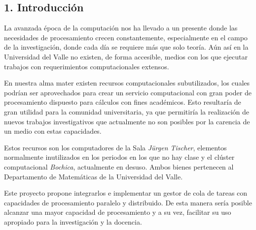 \begin{doublespace}
\begin{tightcenter}
\section{1. Introducción}
\mylinespacing
\end{tightcenter}

La avanzada época de la computación nos ha llevado a un presente donde las necesidades de procesamiento crecen constantemente, especialmente en el campo de la investigación, donde cada día se requiere más que solo teoría. Aún así en la Universidad del Valle no existen, de forma accesible, medios con los que ejecutar trabajos con requerimientos computacionales extensos.

\vspace{3mm} 

En nuestra alma mater existen recursos computacionales subutilizados, los cuales podrían ser aprovechados para crear un servicio computacional con gran poder de procesamiento dispuesto para cálculos con fines académicos. Esto resultaría de gran utilidad para la comunidad universitaria, ya que permitiría la realización de nuevos trabajos investigativos que actualmente no son posibles por la carencia de un medio con estas capacidades.

\vspace{3mm} 

Estos recursos son los computadores de la Sala \textit{Jürgen Tischer}, elementos normalmente inutilizados en los periodos en los que no hay clase y el clúster computacional \textit{Bochica}, actualmente en desuso. Ambos bienes pertenecen al Departamento de Matemáticas de la Universidad del Valle.

\vspace{3mm} 

Este proyecto propone integrarlos e implementar un gestor de cola de tareas con capacidades de procesamiento paralelo y distribuido. De esta manera sería posible alcanzar una mayor capacidad de procesamiento y a su vez, facilitar su uso apropiado para la investigación y la docencia.


\mylinespacing
\mylinespacing
\begin{tightcenter}
\end{tightcenter}
\end{doublespace}
